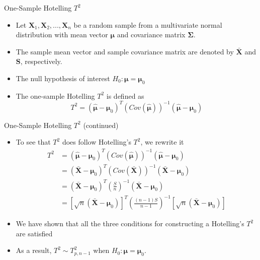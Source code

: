 \documentclass[
  ignorenonframetext,
]{beamer}
\providecommand{\tightlist}{%
  \setlength{\itemsep}{0pt}\setlength{\parskip}{0pt}}
\begin{document}
\begin{frame}{One-Sample Hotelling \(T^2\)}
\protect\hypertarget{one-sample-hotelling-t2}{}
\begin{itemize}
\tightlist
\item
  Let \(\boldsymbol{X}_1, \boldsymbol{X}_2, ..., \boldsymbol{X}_n\) be a
  random sample from a multivariate normal distribution with mean vector
  \(\boldsymbol{\mu}\) and covariance matrix \(\boldsymbol{\Sigma}\).
\item
  The sample mean vector and sample covariance matrix are denoted by
  \(\bar{\mathbf X}\) and \(\mathbf S\), respectively.
\item
  The null hypothesis of interest
  \(H_0: \boldsymbol \mu = \boldsymbol \mu_0\)
\item
  The one-sample Hotelling \(T^2\) is defined as
  \[T^2=(\hat{\mathbf \mu} - \mathbf \mu_0)^T \left(Cov(\hat{\mathbf \mu})\right)^{-1}(\hat{\mathbf \mu} - \mathbf \mu_0)\]
\end{itemize}
\end{frame}

\begin{frame}{One-Sample Hotelling \(T^2\) (continued)}
\protect\hypertarget{one-sample-hotelling-t2-continued}{}
\begin{itemize}
\item
  To see that \(T^2\) does follow Hotelling's \(T^2\), we rewrite it \[
  \begin{aligned}
  T^2&=(\hat{\mathbf \mu} - \mathbf \mu_0)^T \left(Cov(\hat{\mathbf \mu})\right)^{-1}(\hat{\mathbf \mu} - \mathbf \mu_0)\\
  &= (\bar{\mathbf X} - \mathbf \mu_0)^T \left(Cov(\bar{\mathbf X})\right)^{-1}(\bar{\mathbf X} - \mathbf \mu_0)\\
  &= (\bar{\mathbf X} - \mathbf \mu_0)^T \left(\frac{S}{n}\right)^{-1}(\bar{\mathbf X} - \mathbf \mu_0)\\
  &= [\sqrt{n}(\bar{\mathbf X} - \mathbf \mu_0)]^T \left(\frac{(n-1)S}{n-1}\right)^{-1}[\sqrt{n}(\bar{\mathbf X} - \mathbf \mu_0)]
  \end{aligned}
  \]
\item
  We have shown that all the three conditions for constructing a
  Hotelling's \(T^2\) are satisfied
\item
  As a result, \(T^2\sim T_{p, n-1}^2\) when
  \(H_0: \boldsymbol \mu=\boldsymbol \mu_0\).
\end{itemize}
\end{frame}
\end{document}
